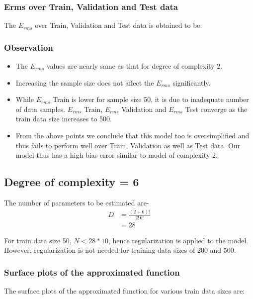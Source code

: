 \documentclass[12pt,a4paper]{article}
\newcommand{\noi}{\noindent}
\begin{document}
\subsubsection{Erms over Train, Validation and Test data}
The $E_{rms}$ over Train, Validation and Test data is obtained to be:


\subsubsection{Observation}
\begin{itemize}
    \itemsep0em
    \item The $E_{rms}$ values are nearly same as that for degree of complexity 2.
    \item Increasing the sample size does not affect the $E_{rms}$ significantly.
    \item While $E_{rms}$ Train is lower for sample size 50, it is due to inadequate number of data samples. $E_{rms}$ Train, $E_{rms}$ Validation and $E_{rms}$ Test converge as the train data size increases to 500.
    \item From the above points we conclude that this model too is oversimplified and thus fails to perform well over Train, Validation as well as Test data. Our model thus has a high bias error similar to model of complexity 2. 
\end{itemize}

\subsection{Degree of complexity = 6}
The number of parameters to be estimated are-
\begin{equation}
    \begin{split}
        D&=\frac{(2+6)!}{2!\,6!} \\
        &=28
    \end{split}
\end{equation}

\noi
For train data size 50, $N<28*10$, hence regularization is applied to the model. However, regularization is not needed for training data sizes of 200 and 500. 

\subsubsection{Surface plots of the approximated function}
The surface plots of the approximated function for various train data sizes are:
\end{document}
